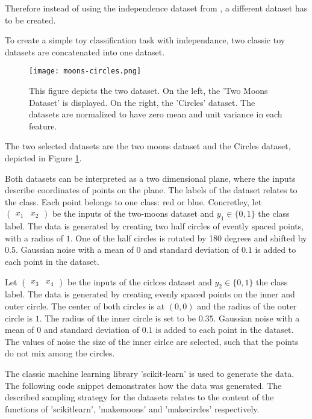 Therefore instead of using the independence dataset from \autocite{BIMT}, a different dataset has to be created.

To create a simple toy classification task with independance, two classic toy datasets are concatenated into one dataset.
\begin{figure}[ht]
    \centering
    \texttt{[image: moons-circles.png]}
    \caption{This figure depicts the two dataset. On the left, the 'Two Moons Dataset' is displayed. On the right, the 'Circles' dataset. The datasets are normalized to have zero mean and unit variance in each feature.}
    \label{fig:moons_circles}
\end{figure}
The two selected datasets are the two moons dataset and the Circles dataset, depicted in Figure \ref{fig:moons_circles}.

Both datasets can be interpreted as a two dimensional plane, where the inputs describe coordinates of points on the plane. 
The labels of the dataset relates to the class.
Each point belongs to one class: red or blue.
Concretley, let $\begin{pmatrix} x_1 & x_2 \end{pmatrix}$ be the inputs of the two-moons dataset and $y_1 \in \{0,1\}$ the class label.
The data is generated by creating two half circles of evently spaced points, with a radius of $1$.
One of the half circles is rotated by 180 degrees and shifted by $0.5$.
Gaussian noise with a mean of $0$ and standard deviation of $0.1$ is added to each point in the dataset.

Let $\begin{pmatrix} x_3 & x_4 \end{pmatrix}$ be the inputs of the cirlces dataset and $y_2 \in \{0,1\}$ the class label.
The data is generated by creating evenly spaced points on the inner and outer circle. 
The center of both circles is at $(0,0)$ and the radius of the outer circle is $1$.
The radius of the inner circle is set to be $0.35$.
Gaussian noise with a mean of $0$ and standard deviation of $0.1$ is added to each point in the dataset.
The values of noise the size of the inner cirlce are selected, such that the points do not mix among the circles.

The classic machine learning library 'scikit-learn' is used to generate the data. 
The following code snippet demonstrates how the data was generated.
The described sampling strategy for the datasets relates to the content of the functions of 'scikitlearn', 'makemoons' and 'makecircles' respectively.

